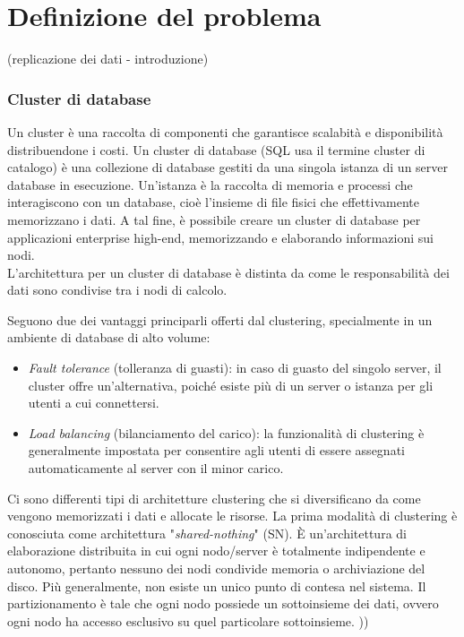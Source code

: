 \chapter{Definizione del problema}
\setcounter{section}{1}
(replicazione dei dati - introduzione)
\item
\subsection{Cluster di database}
Un cluster \`{e} una raccolta di componenti che garantisce scalabit\`{a} e disponibilit\`{a} distribuendone i costi. Un cluster di database (SQL usa il termine cluster di catalogo) \`{e} una collezione di database gestiti da una singola istanza di un server database in esecuzione. Un'istanza \`{e} la raccolta di memoria e processi che interagiscono con un database, cio\`{e} l'insieme di file fisici che effettivamente memorizzano i dati.\cite{etichetta1} A tal fine, \`{e} possibile creare un cluster di database per applicazioni enterprise high-end, memorizzando e elaborando informazioni sui nodi.\\ L'architettura per un cluster di database \`{e} distinta da come le responsabilit\`{a} dei dati sono condivise tra i nodi di calcolo.

Seguono due dei vantaggi principarli offerti dal clustering, specialmente in un ambiente di database di alto volume:
\begin{itemize}
\item 
\textit{Fault tolerance} (tolleranza di guasti): in caso di guasto del singolo server, il cluster offre un'alternativa, poich\'{e} esiste pi\`{u} di un server o istanza per gli utenti a cui connettersi.
\item
\textit{Load balancing} (bilanciamento del carico): la funzionalit\`{a} di clustering \`{e} generalmente impostata per consentire agli utenti di essere assegnati automaticamente al server con il minor carico.\cite{etichetta1} 
\end{itemize}
Ci sono differenti tipi di architetture clustering che si diversificano da come vengono memorizzati i dati e allocate le risorse.
La prima modalit\`{a} di clustering \`{e} conosciuta come architettura "\textit{shared-nothing}" (SN). \`{E} un'architettura di elaborazione distribuita in cui ogni nodo/server \`{e} totalmente indipendente e autonomo, pertanto nessuno dei nodi condivide memoria o archiviazione del disco. Pi\`{u} generalmente, non esiste un unico punto di contesa nel sistema.\cite{etichetta5} Il partizionamento \`{e} tale che ogni nodo possiede un sottoinsieme dei dati, ovvero ogni nodo ha accesso esclusivo su quel particolare sottoinsieme. 
\cite{etichetta2}))\\


